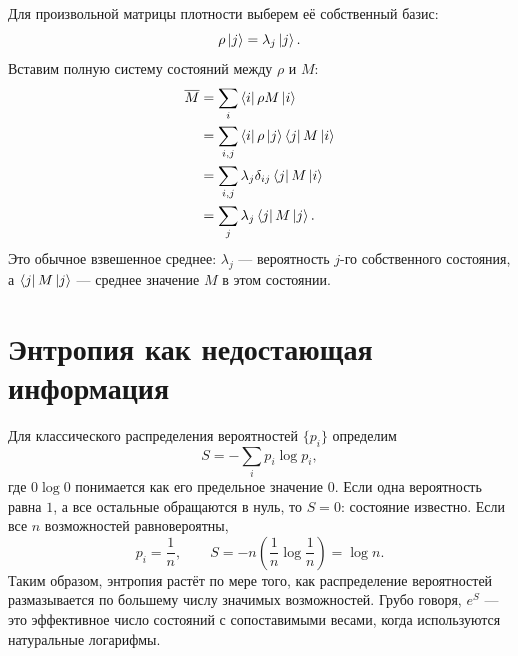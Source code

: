 Для произвольной матрицы плотности выберем её собственный базис:
\begin{equation}
\rho\left\lvert j\right\rangle=\lambda_j\left\lvert j\right\rangle.
\end{equation}
Вставим полную систему состояний между \(\rho\) и \(M\):
\begin{align}
\overline{M}
&=\sum_i\left\langle i\right\rvert\rho M\left\lvert i\right\rangle \\
&=\sum_{i,j}\left\langle i\right\rvert\rho\left\lvert j\right\rangle\left\langle j\right\rvert M\left\lvert i\right\rangle \\
&=\sum_{i,j}\lambda_j\delta_{ij}\left\langle j\right\rvert M\left\lvert i\right\rangle \\
&=\sum_j\lambda_j\left\langle j\right\rvert M\left\lvert j\right\rangle.
\end{align}
Это обычное взвешенное среднее: \(\lambda_j\) — вероятность \(j\)-го собственного состояния, а \(\left\langle j\right\rvert M\left\lvert j\right\rangle\) — среднее значение \(M\) в этом состоянии.

\begin{classroomqa}
\end{classroomqa}

\section{Энтропия как недостающая информация}

Для классического распределения вероятностей \(\{p_i\}\) определим
\begin{equation}
S=-\sum_i p_i\log p_i,
\end{equation}
где \(0\log 0\) понимается как его предельное значение \(0\). Если одна вероятность равна \(1\), а все остальные обращаются в нуль, то \(S=0\): состояние известно. Если все \(n\) возможностей равновероятны,
\begin{equation}
p_i=\frac{1}{n},
\qquad
S=-n\left(\frac{1}{n}\log\frac{1}{n}\right)=\log n.
\end{equation}
Таким образом, энтропия растёт по мере того, как распределение вероятностей размазывается по большему числу значимых возможностей. Грубо говоря, \(e^S\) — это эффективное число состояний с сопоставимыми весами, когда используются натуральные логарифмы.


